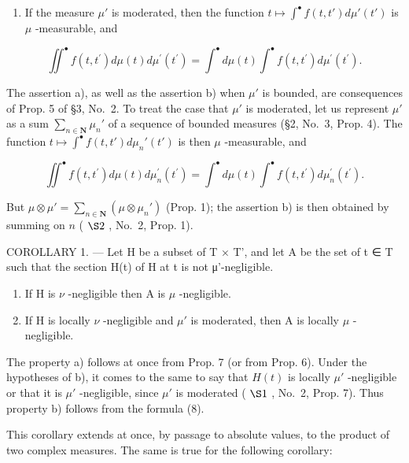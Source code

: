 \begin{enumerate}
\def\labelenumi{\alph{enumi})}
\setcounter{enumi}{1}
\tightlist
\item
  If the measure \(\mu'\) is moderated, then the function \(t \mapsto \int^{\bullet} f(t, t') d\mu'(t')\) is \(\mu\) -measurable, and
\end{enumerate}

\[
\iint^ {\bullet} f (t, t ^ {\prime}) d \mu (t) d \mu^ {\prime} (t ^ {\prime}) = \int^ {\bullet} d \mu (t) \int^ {\bullet} f (t, t ^ {\prime}) d \mu^ {\prime} (t ^ {\prime}).\tag{8}
\]

The assertion a), as well as the assertion b) when \(\mu'\) is bounded, are consequences of Prop. 5 of §3, No.~2. To treat the case that \(\mu'\) is moderated, let us represent \(\mu'\) as a sum \(\sum_{n\in\mathbf{N}}\mu_n'\) of a sequence of bounded measures (§2, No.~3, Prop. 4). The function \(t\mapsto\int^{\bullet}f(t,t')d\mu_n'(t')\) is then \(\mu\) -measurable, and

\[
\iint^ {\bullet} f (t, t ^ {\prime}) d \mu (t) d \mu_ {n} ^ {\prime} (t ^ {\prime}) = \int^ {\bullet} d \mu (t) \int^ {\bullet} f (t, t ^ {\prime}) d \mu_ {n} ^ {\prime} (t ^ {\prime}).
\]

But \(\mu \otimes \mu' = \sum_{n \in \mathbf{N}} (\mu \otimes \mu_n')\) (Prop. 1); the assertion b) is then obtained by summing on \(n\) ( \(\S 2\) , No.~2, Prop. 1).

COROLLARY 1. --- Let H be a subset of T × T', and let A be the set of t ∈ T such that the section H(t) of H at t is not μ'-negligible.

\begin{enumerate}
\def\labelenumi{\alph{enumi})}
\item
  If H is \(\nu\) -negligible then A is \(\mu\) -negligible.
\item
  If H is locally \(\nu\) -negligible and \(\mu'\) is moderated, then A is locally \(\mu\) -negligible.
\end{enumerate}

The property a) follows at once from Prop. 7 (or from Prop. 6). Under the hypotheses of b), it comes to the same to say that \(H(t)\) is locally \(\mu'\) -negligible or that it is \(\mu'\) -negligible, since \(\mu'\) is moderated ( \(\S1\) , No.~2, Prop. 7). Thus property b) follows from the formula (8).

This corollary extends at once, by passage to absolute values, to the product of two complex measures. The same is true for the following corollary:

